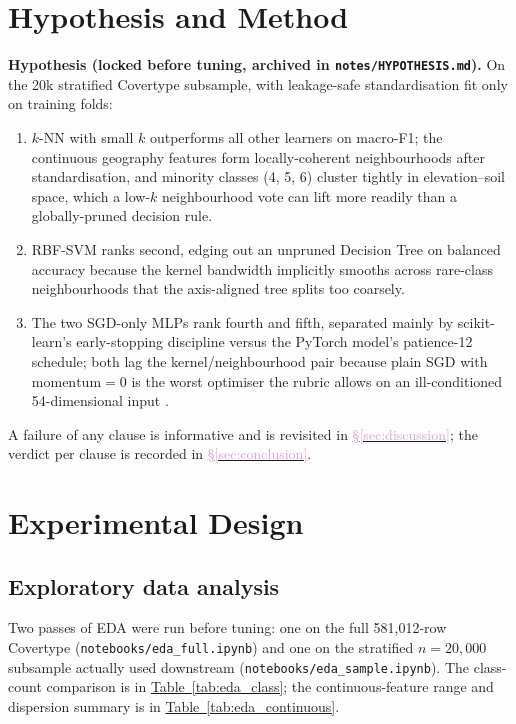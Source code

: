 \documentclass[conference]{IEEEtran}
\newcommand{\tabref}[1]{\hyperref[#1]{\textcolor{sage}{Table~\ref*{#1}}}}
\newcommand{\secref}[1]{\hyperref[#1]{\textcolor{plum}{\S\ref*{#1}}}}
\begin{document}
\section{Hypothesis and Method}\label{sec:method}
\textbf{Hypothesis (locked before tuning, archived in \texttt{notes/HYPOTHESIS.md}).}
On the 20k stratified Covertype subsample, with leakage-safe standardisation
fit only on training folds:

\begin{enumerate}[leftmargin=*]
  \item $k$-NN with small $k$ outperforms all other learners on macro-F1; the
        continuous geography features form locally-coherent neighbourhoods
        after standardisation, and minority classes (4, 5, 6) cluster tightly
        in elevation--soil space, which a low-$k$ neighbourhood vote can lift
        more readily than a globally-pruned decision rule.
  \item RBF-SVM ranks second, edging out an unpruned Decision Tree on
        balanced accuracy because the kernel bandwidth implicitly smooths
        across rare-class neighbourhoods that the axis-aligned tree splits
        too coarsely.
  \item The two SGD-only MLPs rank fourth and fifth, separated mainly by
        scikit-learn's early-stopping discipline versus the PyTorch model's
        patience-12 schedule; both lag the kernel/neighbourhood pair because
        plain SGD with $\mathrm{momentum}{=}0$ is the worst optimiser the
        rubric allows on an ill-conditioned 54-dimensional input
        \cite{ruder2017overview,loshchilov2019adamw}.
\end{enumerate}
\noindent A failure of any clause is informative and is revisited in
\secref{sec:discussion}; the verdict per clause is recorded in
\secref{sec:conclusion}.

\section{Experimental Design}\label{sec:design}

\subsection{Exploratory data analysis}\label{sec:design:eda}
Two passes of EDA were run before tuning: one on the full 581,012-row Covertype
(\texttt{notebooks/eda\_full.ipynb}) and one on the stratified $n{=}20{,}000$
subsample actually used downstream (\texttt{notebooks/eda\_sample.ipynb}). The
class-count comparison is in \tabref{tab:eda_class}; the continuous-feature
range and dispersion summary is in \tabref{tab:eda_continuous}.
\end{document}
